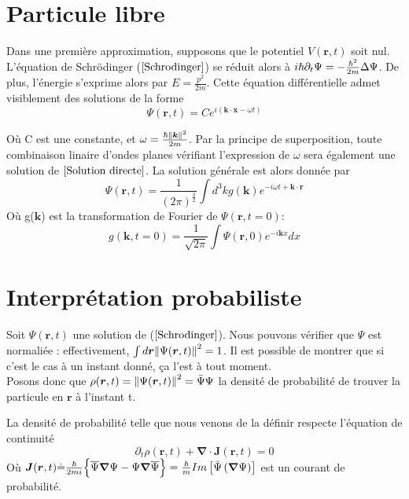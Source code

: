 \documentclass[../notesdecours]{subfiles}
\begin{document}
\section{Particule libre}

Dans une première approximation, supposons que le potentiel $V(\bm{r},t)$ soit nul. L'équation de Schrödinger ($\ref{Schrodinger}$) se réduit alors à $i\hbar \partial_t \Psi = - \frac{\hbar^2}{2m} \Delta \Psi$. De plus, l'énergie s'exprime alors par $E = \frac{p^2}{2m}$. Cette équation différentielle admet visiblement des solutions de la forme
\begin{equation}
\label{Solution directe}
\Psi (\bm{r},t) = Ce^{i(\bm{k} \cdot \bm{x} - \omega t)}
\end{equation}

Où C est une constante, et $\omega = \frac{\hbar \norm{\bm{k}}^2}{2m}$. Par la principe de superposition, toute combinaison linaire d'ondes planes vérifiant l'expression de $\omega$ sera également une solution de $\ref{Solution directe}$. La solution générale est alors donnée par 
\begin{equation}
\label{Solution générale}
\Psi (\bm{r},t) = \frac{1}{\left( 2 \pi \right)^{\frac{3}{2}}}\int d^3k g(\bm{k}) e^{-i \omega t + \bm{k} \cdot \bm{r}}
\end{equation}
Où g($\bm{k}$) est la transformation de Fourier de $\Psi (\bm{r},t = 0)$:
\begin{equation}
g(\bm{k},t=0) = \frac{1}{\sqrt{2\pi}} \int \Psi (\bm{r},0)e^{-i\bm{k}x} dx
\end{equation}

\section{Interprétation probabiliste}

Soit $\Psi (\bm{r},t)$ une solution de ($\ref{Schrodinger}$). Nous pouvons vérifier que $\Psi$ est normaliée : effectivement, $\int d\bm{r} \norm{\Psi(\bm{r},t)}^2 = 1$. Il est possible de montrer que si c'est le cas à un instant donné, ça l'est à tout moment.\\

Posons donc que $\rho (\bm{r},t) = \norm{\Psi (\bm{r},t)}^2 = \bar{\Psi} \Psi$ la densité de probabilité de trouver la particule en $\bm{r}$ à l'instant t.\\

\begin{Property}
La densité de probabilité telle que nous venons de la définir respecte l'équation de continuité
\begin{equation}
\label{Equation de Continuité}
\partial_t \rho (\bm{r},t) + \bm{\nabla} \cdot \bm{J} (\bm{r},t) = 0
\end{equation}
Où $\bm{J} (\bm{r},t) \dot{=} \frac{\hbar}{2mi} \Big\{\overline{\Psi}\bm{\nabla}\Psi - \Psi\bm{\nabla}\overline{\Psi}\Big\} = \frac{\hbar}{m} Im \left[\bar{\Psi} \left(\bm{\nabla} \Psi\right)\right]$ est un courant de probabilité.\\
\end{Property}
\end{document}
